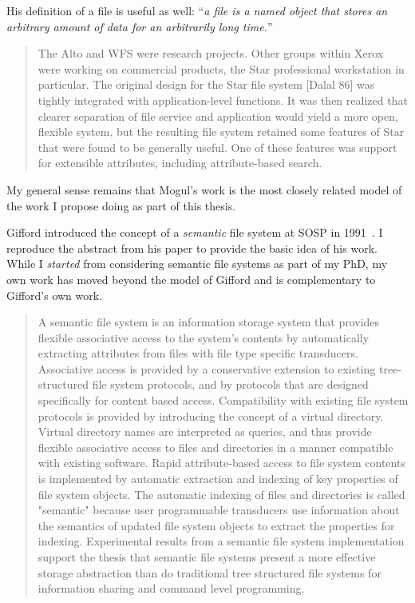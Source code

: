 His definition of a file is useful as well: ``\emph{a \emph{file} is a named
    object that stores an arbitrary amount of data for an arbitrarily long time.}''

\begin{quotation}
    The Alto and WFS were research projects. Other groups within Xerox were working on commercial
    products, the Star professional workstation in particular. The original design for the Star file system [Dalal
            86] was tightly integrated with application-level functions. It was then realized that clearer separation of
    file service and application would yield a more open, flexible system, but the resulting file system retained
    some features of Star that were found to be generally useful. One of these features was support for
    extensible attributes, including attribute-based search.
\end{quotation}

My general sense remains that Mogul's work is the most closely related model of
the work I propose doing as part of this thesis.


Gifford introduced the concept of a \emph{semantic} file system at SOSP in
1991~\cite{gifford1991semantic}.  I reproduce the abstract from his paper to
provide the basic idea of his work.  While I \emph{started} from considering
semantic file systems as part of my PhD, my own work has moved beyond the model
of Gifford and is complementary to Gifford's own work.

\begin{quotation}
    A semantic file system is an information storage system that
    provides flexible associative access to the system's contents
    by automatically extracting attributes from files with file
    type specific transducers. Associative access is provided by a
    conservative extension to existing tree-structured file system
    protocols, and by protocols that are designed specifically for
    content based access. Compatibility with existing file system
    protocols is provided by introducing the concept of a
    virtual directory. Virtual directory names are interpreted as
    queries, and thus provide flexible associative access to files
    and directories in a manner compatible with existing software.
    Rapid attribute-based access to file system contents
    is implemented by automatic extraction and indexing of key
    properties of file system objects. The automatic indexing of
    files and directories is called "semantic" because user programmable
    transducers use information about the semantics
    of updated file system objects to extract the properties for
    indexing. Experimental results from a semantic file system
    implementation support the thesis that semantic file systems
    present a more effective storage abstraction than do traditional
    tree structured file systems for information sharing
    and command level programming.
\end{quotation}

